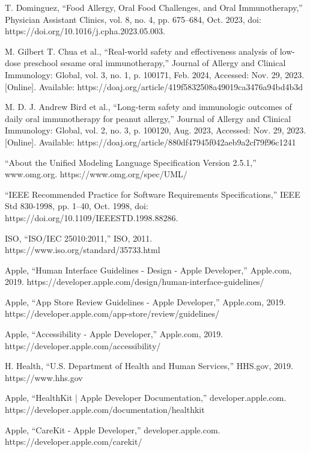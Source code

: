 \begin{thebibliography}{100}
     T. Dominguez, “Food Allergy, Oral Food Challenges, and Oral Immunotherapy,” Physician Assistant Clinics, vol. 8, no. 4, pp. 675–684, Oct. 2023, doi: https://doi.org/10.1016/j.cpha.2023.05.003.

     M. Gilbert T. Chua et al., “Real-world safety and effectiveness analysis of low-dose preschool sesame oral immunotherapy,” Journal of Allergy and Clinical Immunology: Global, vol. 3, no. 1, p. 100171, Feb. 2024, Accessed: Nov. 29, 2023. [Online]. Available: https://doaj.org/article/419f5832508a49019ca3476a94bd4b3d

     M. D. J. Andrew Bird et al., “Long-term safety and immunologic outcomes of daily oral immunotherapy for peanut allergy,” Journal of Allergy and Clinical Immunology: Global, vol. 2, no. 3, p. 100120, Aug. 2023, Accessed: Nov. 29, 2023. [Online]. Available: https://doaj.org/article/880df47945f042aeb9a2cf79f96c1241

     “About the Unified Modeling Language Specification Version 2.5.1,” www.omg.org. https://www.omg.org/spec/UML/

     “IEEE Recommended Practice for Software Requirements Specifications,” IEEE Std 830-1998, pp. 1–40, Oct. 1998, doi: https://doi.org/10.1109/IEEESTD.1998.88286.

     ISO, “ISO/IEC 25010:2011,” ISO, 2011. https://www.iso.org/standard/35733.html 

     Apple, “Human Interface Guidelines - Design - Apple Developer,” Apple.com, 2019. https://developer.apple.com/design/human-interface-guidelines/

     Apple, “App Store Review Guidelines - Apple Developer,” Apple.com, 2019. https://developer.apple.com/app-store/review/guidelines/

     Apple, “Accessibility - Apple Developer,” Apple.com, 2019. https://developer.apple.com/accessibility/

     H. Health, “U.S. Department of Health and Human Services,” HHS.gov, 2019. https://www.hhs.gov

     Apple, “HealthKit | Apple Developer Documentation,” developer.apple.com. https://developer.apple.com/documentation/healthkit

     Apple, “CareKit - Apple Developer,” developer.apple.com. https://developer.apple.com/carekit/


\end{thebibliography}
